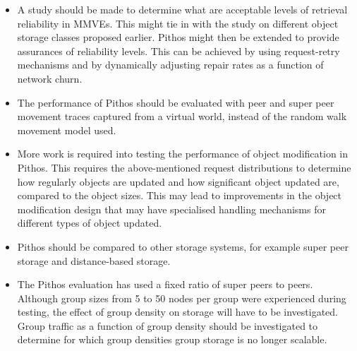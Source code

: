 \begin{itemize}
\item A study should be made to determine what are acceptable levels of retrieval reliability in MMVEs. This might tie in with the study on different object storage classes proposed earlier. Pithos might then be extended to provide assurances of reliability levels. This can be achieved by using request-retry mechanisms and by dynamically adjusting repair rates as a function of network churn.
    
\item The performance of Pithos should be evaluated with peer and super peer movement traces captured from a virtual world, instead of the random walk movement model used.
    
\item More work is required into testing the performance of object modification in Pithos. This requires the above-mentioned request distributions to determine how regularly objects are updated and how significant object updated are, compared to the object sizes. This may lead to improvements in the object modification design that may have specialised handling mechanisms for different types of object updated.

\item Pithos should be compared to other storage systems, for example super peer storage and distance-based storage.
    
\item The Pithos evaluation has used a fixed ratio of super peers to peers. Although group sizes from 5 to 50 nodes per group were experienced during testing, the effect of group density on storage will have to be investigated. Group traffic as a function of group density should be investigated to determine for which group densities group storage is no longer scalable.
\end{itemize}

